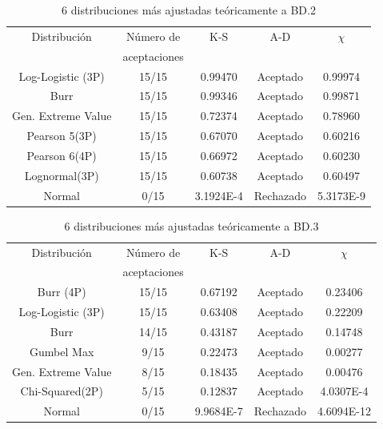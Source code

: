 \documentclass[12pt]{report}
\begin{document}
\begin{table}[h!]
	\centering
		\caption{6 distribuciones más ajustadas teóricamente a BD.2}
	\begin{tabular}{|c|c|c|c|c|}			
		\hline
		Distribución	  &Número de	&K-S	&A-D	& $\chi$  \\
							&	aceptaciones &     &	 &     \\ \hline
		Log-Logistic (3P)   &    15/15    & 0.99470   & 	Aceptado     &0.99974    \\ \hline
		Burr &    15/15	& 0.99346    &  Aceptado   	& 0.99871   \\ \hline
		Gen. Extreme Value &    15/15	& 0.72374  	&  Aceptado 	&   0.78960 	\\ \hline 
		Pearson 5(3P)  &    15/15	& 0.67070   &   Aceptado	& 0.60216   	\\ \hline
		Pearson 6(4P)  &   15/15	&     0.66972   &      	Aceptado   &  0.60230  	\\ \hline
		Lognormal(3P)   &   15/15	& 0.60738    &   	Aceptado	& 0.60497    	\\ \hline
		Normal   &   0/15	& 3.1924E-4   &   	Rechazado	& 5.3173E-9	\\ \hline  %
	\end{tabular}

	\label{teo_BD2}
\end{table}



\begin{table}[h!]
	\centering
		\caption{6 distribuciones más ajustadas teóricamente a BD.3}
	\begin{tabular}{|c|c|c|c|c|}			
		\hline
		Distribución	  &Número de	&K-S	&A-D	& $\chi$  \\
		&	aceptaciones &     &	 &     \\ \hline
		
		Burr (4P) &    15/15	& 0.67192    &  Aceptado   	& 0.23406   \\ \hline
		Log-Logistic (3P)    &    15/15    & 0.63408   & 	Aceptado     &0.22209    \\ \hline
		
		Burr &    14/15	& 0.43187	&  Aceptado 	&   0.14748	\\ \hline 
		Gumbel Max  &    9/15	& 0.22473  &   Aceptado	& 0.00277   	\\ \hline
		Gen. Extreme Value  &   8/15	&     0.18435   &      	Aceptado   &  0.00476	\\ \hline
		Chi-Squared(2P)   &   5/15	& 0.12837    &   	Aceptado	& 4.0307E-4   	\\ \hline
		Normal   &   0/15	& 9.9684E-7    &   	Rechazado	& 4.6094E-12	\\ \hline %
	\end{tabular}

	\label{teo_BD3}
\end{table}
\end{document}
